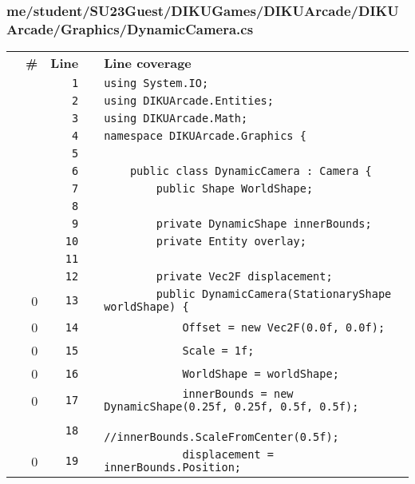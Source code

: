 \documentclass[a4paper,landscape,10pt]{article}
\begin{document}
\subsubsection{me/student/SU23Guest/DIKUGames/DIKUArcade/DIKUArcade/Graphics/DynamicCamera.cs}
\begin{longtable}[l]{lrrll}
\textbf{} & \textbf{\#} & \textbf{Line} & \textbf{} & \textbf{Line coverage}\\
\cellcolor{gray} &  & \verb~1~ & & \verb~using System.IO;~\\
\cellcolor{gray} &  & \verb~2~ & & \verb~using DIKUArcade.Entities;~\\
\cellcolor{gray} &  & \verb~3~ & & \verb~using DIKUArcade.Math;~\\
\cellcolor{gray} &  & \verb~4~ & & \verb~namespace DIKUArcade.Graphics {~\\
\cellcolor{gray} &  & \verb~5~ & & \verb~~\\
\cellcolor{gray} &  & \verb~6~ & & \verb~    public class DynamicCamera : Camera {~\\
\cellcolor{gray} &  & \verb~7~ & & \verb~        public Shape WorldShape;~\\
\cellcolor{gray} &  & \verb~8~ & & \verb~~\\
\cellcolor{gray} &  & \verb~9~ & & \verb~        private DynamicShape innerBounds;~\\
\cellcolor{gray} &  & \verb~10~ & & \verb~        private Entity overlay;~\\
\cellcolor{gray} &  & \verb~11~ & & \verb~~\\
\cellcolor{gray} &  & \verb~12~ & & \verb~        private Vec2F displacement;~\\
\cellcolor{red} & 0 & \verb~13~ & & \verb~        public DynamicCamera(StationaryShape worldShape) {~\\
\cellcolor{red} & 0 & \verb~14~ & & \verb~            Offset = new Vec2F(0.0f, 0.0f);~\\
\cellcolor{red} & 0 & \verb~15~ & & \verb~            Scale = 1f;~\\
\cellcolor{red} & 0 & \verb~16~ & & \verb~            WorldShape = worldShape;~\\
\cellcolor{red} & 0 & \verb~17~ & & \verb~            innerBounds = new DynamicShape(0.25f, 0.25f, 0.5f, 0.5f);~\\
\cellcolor{gray} &  & \verb~18~ & & \verb~            //innerBounds.ScaleFromCenter(0.5f);~\\
\cellcolor{red} & 0 & \verb~19~ & & \verb~            displacement = innerBounds.Position;~\\

\end{longtable}
\end{document}
